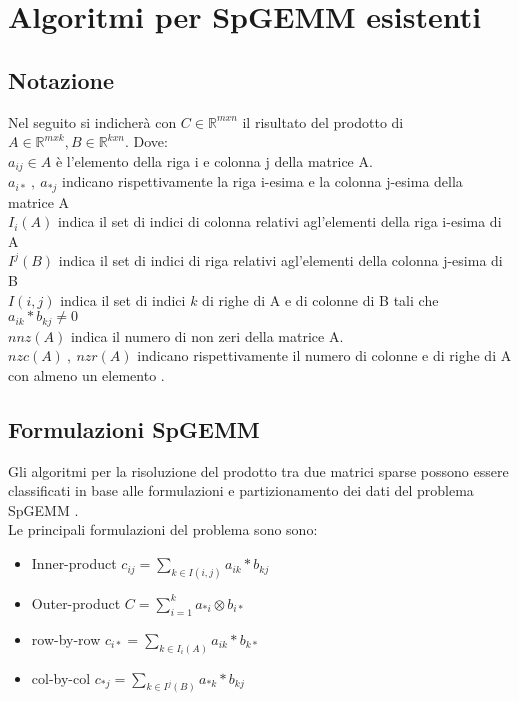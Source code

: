 \chapter{Algoritmi per SpGEMM esistenti}
\label{Chapter1} %



\section{Notazione}
Nel seguito si indicherà con $C \in \mathbb{R}^{m x n}$ il risultato del prodotto di 
$A \in \mathbb{R}^{m x k},B \in \mathbb{R}^{k x n}$. Dove:\\ 
$a_{ij} \in A$ è l'elemento della riga i e colonna j della matrice A.\\
$a_{i*}~,~a_{*j}$ indicano rispettivamente la riga i-esima e la colonna j-esima della matrice A\\
$I_i(A)$ indica il set di indici di colonna relativi agl'elementi \nnz della riga i-esima di A\\
$I^j(B)$ indica il set di indici di riga relativi agl'elementi \nnz della colonna j-esima di B\\
$I(i,j)$ indica il set di indici $k$ di righe di A e di colonne di B tali che
$a_{ik}*b_{kj} \neq 0$\\
$nnz(A)$ indica il numero di non zeri della matrice A. \\ 
$nzc(A)~,~nzr(A)$ indicano rispettivamente il numero di colonne e di righe di A 
con almeno un elemento \nnz.\\

\section{Formulazioni SpGEMM}
\label{Ch1:formulazioni}
Gli algoritmi per la risoluzione del prodotto tra due matrici sparse possono
essere classificati in base alle formulazioni e partizionamento dei dati del problema SpGEMM 
\parencite{sysReviewChi}.\\ Le principali formulazioni del problema sono sono:
\begin{itemize}
  \item Inner-product \qquad $c_{ij} = \sum\limits_{k \in I(i,j)}  a_{ik} \ast  b_{kj}$
  \item Outer-product \qquad $C = \sum\limits_{i=1}^k  a_{*i} \otimes  b_{i*}$		
  \item row-by-row	  \qquad $c_{i*} = \sum\limits_{k \in I_i(A)}  a_{ik} \ast  b_{k*}$
  \item col-by-col    \qquad $c_{*j} = \sum\limits_{k \in I^j(B)}  a_{*k} \ast  b_{kj}$
\end{itemize}

